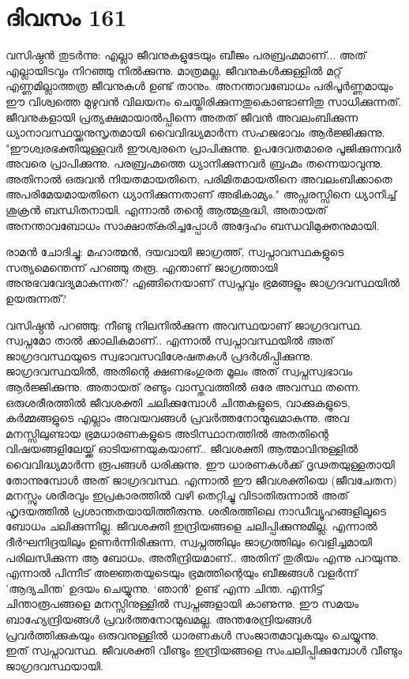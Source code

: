 \section{ദിവസം 161}


വസിഷ്ഠൻ തുടർന്നു: എല്ലാ ജീവനുകളുടേയും ബീജം പരബ്രഹ്മമാണ്‌...  അത് എല്ലായിടവും നിറഞ്ഞു നിൽക്കുന്നു. മാത്രമല്ല, ജീവനുകൾക്കുള്ളിൽ മറ്റ് എണ്ണമില്ലാത്തത്ര ജീവനുകൾ ഉണ്ട് താനും. അനന്താവബോധം പരിപൂർണ്ണമായും ഈ വിശ്വത്തെ മുഴുവൻ വിലയനം ചെയ്തിരിക്കുന്നതുകൊണ്ടാണിതു സാധിക്കുന്നത്. ജീവനുകളായി പ്രത്യക്ഷമായാൽപ്പിന്നെ അതത് ജീവൻ അവലംബിക്കുന്ന ധ്യാനാവസ്ഥയ്ക്കനുസൃതമായി വൈവിദ്ധ്യമാര്‍ന്ന സഹജഭാവം ആർജ്ജിക്കുന്നു. "ഈശ്വരഭക്തിയുള്ളവർ ഈശ്വരനെ പ്രാപിക്കുന്നു. ഉപദേവതമാരെ പൂജിക്കുന്നവർ അവരെ പ്രാപിക്കുന്നു. പരബ്രഹ്മത്തെ ധ്യാനിക്കുന്നവർ ബ്രഹ്മം തന്നെയാവുന്നു. അതിനാൽ ഒരുവൻ നിയതമായതിനെ, പരിമിതമായതിനെ അവലംബിക്കാതെ അപരിമേയമായതിനെ ധ്യാനിക്കുന്നതാണ്‌ അഭികാമ്യം."  അപ്സരസ്സിനെ ധ്യാനിച്ച് ശുക്രൻ ബന്ധിതനായി. എന്നാൽ തന്റെ ആത്മശുദ്ധി, അതായത് അനന്താവബോധം സാക്ഷാത്കരിച്ചപ്പോൾ അദ്ദേഹം ബന്ധവിമുക്തനുമായി.

രാമൻ ചോദിച്ചു: മഹാത്മൻ, ദയവായി ജാഗ്രത്ത്, സ്വപ്നാവസ്ഥകളുടെ സത്യമെന്തെന്ന്‌ പറഞ്ഞു തരൂ. എന്താണ്‌ ജാഗ്രത്തായി അനുഭവവേദ്യമാകുന്നത്? എങ്ങിനെയാണ്‌ സ്വപ്നവും ഭ്രമങ്ങളും ജാഗ്രദവസ്ഥയിൽ ഉയരുന്നത്?

വസിഷ്ഠൻ പറഞ്ഞു: നീണ്ടു നിലനിൽക്കുന്ന അവസ്ഥയാണ്‌ ജാഗ്രദവസ്ഥ. സ്വപ്നമോ താൽ ക്കാലികമാണ്‌..  എന്നാൽ സ്വപ്നാവസ്ഥയിൽ അത് ജാഗ്രദവസ്ഥയുടെ സ്വഭാവസവിശേഷതകൾ പ്രദർശിപ്പിക്കുന്നു. ജാഗ്രദവസ്ഥയിൽ, അതിന്റെ ക്ഷണഭംഗുരത മൂലം അത്‌ സ്വപ്നസ്വഭാവം ആർജ്ജിക്കുന്നു. അതായത് രണ്ടും വാസ്തവത്തിൽ ഒരേ അവസ്ഥ തന്നെ. ഒരുശരീരത്തിൽ ജീവശക്തി ചലിക്കുമ്പോൾ ചിന്തകളുടെ, വാക്കുകളുടെ, കർമ്മങ്ങളുടെ എല്ലാം അവയവങ്ങൾ പ്രവർത്തനോന്മുഖമാകുന്നു. അവ മനസ്സിലുണ്ടായ ഭ്രമധാരണകളുടെ അടിസ്ഥാനത്തിൽ അതതിന്റെ വിഷയങ്ങളിലേയ്ക്ക് ഓടിയണയുകയാണ്‌..  ജീവശക്തി ആത്മാവിനുള്ളിൽ വൈവിദ്ധ്യമാർന്ന രൂപങ്ങൾ ധരിക്കുന്നു. ഈ ധാരണകൾക്ക് ദൃഢതയുള്ളതായി തോന്നുമ്പോൾ അത് ജാഗ്രദവസ്ഥ. എന്നാൽ ഈ ജീവശക്തിയെ (ജീവചേതന) മനസ്സും ശരീരവും ഇപ്രകാരത്തിൽ വഴി തെറ്റിച്ചു വിടാതിരുന്നാൽ അത് ഹൃദയത്തിൽ പ്രശാന്തതയായിത്തീരുന്നു. ശരീരത്തിലെ നാഡീവ്യൂഹങ്ങളിലൂടെ ബോധം ചലിക്കുന്നില്ല. ജീവശക്തി ഇന്ദ്രിയങ്ങളെ ചലിപ്പിക്കുന്നുമില്ല.  എന്നാൽ ദീർഘനിദ്രയിലും ഉണർന്നിരിക്കുന്ന, സ്വപ്നത്തിലും ജാഗ്രത്തിലും വെളിച്ചമായി പരിലസിക്കുന്ന ആ ബോധം, അതീന്ദ്രിയമാണ്‌..  അതിന്‌ തുരീയം എന്നു പറയുന്നു. എന്നാൽ പിന്നീട് അജ്ഞതയുടെയും ഭ്രമത്തിന്റെയും ബീജങ്ങൾ വളർന്ന് 'ആദ്യചിന്ത' ഉദയം ചെയ്യുന്നു. ‘ഞാൻ’ ഉണ്ട് എന്ന ചിന്ത. എന്നിട്ട് ചിന്താരൂപങ്ങളെ മനസ്സിനുള്ളിൽ സ്വപ്നങ്ങളായി കാണുന്നു. ഈ സമയം ബാഹ്യേന്ദ്രിയങ്ങൾ പ്രവർത്തനോന്മുഖമല്ല. അന്തരേന്ദ്രിയങ്ങൾ പ്രവർത്തിക്കുകയും ഒരുവനുള്ളിൽ ധാരണകൾ സംജാതമാവുകയും ചെയ്യുന്നു. ഇത് സ്വപ്നാവസ്ഥ. ജീവശക്തി വീണ്ടും ഇന്ദ്രിയങ്ങളെ സംചലിപ്പിക്കുമ്പോൾ വീണ്ടും ജാഗ്രദവസ്ഥയായി. 

